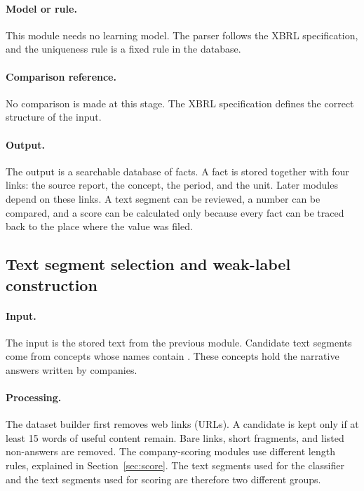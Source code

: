 \paragraph{Model or rule.} This module needs no learning model. The parser follows the XBRL specification, and the uniqueness rule is a fixed rule in the database.

\paragraph{Comparison reference.} No comparison is made at this stage. The XBRL specification \cite{xbrl2013} defines the correct structure of the input.

\paragraph{Output.} The output is a searchable database of facts. A fact is stored together with four links: the source report, the concept, the period, and the unit. Later modules depend on these links. A text segment can be reviewed, a number can be compared, and a score can be calculated only because every fact can be traced back to the place where the value was filed.

\subsection{Text segment selection and weak-label construction}
\label{sec:labels}

\paragraph{Input.} The input is the stored text from the previous module. Candidate text segments come from concepts whose names contain . These concepts hold the narrative answers written by companies.

\paragraph{Processing.} The dataset builder first removes web links (URLs). A candidate is kept only if at least 15 words of useful content remain. Bare links, short fragments, and listed non-answers are removed. The company-scoring modules use different length rules, explained in Section~\ref{sec:score}. The text segments used for the classifier and the text segments used for scoring are therefore two different groups.

